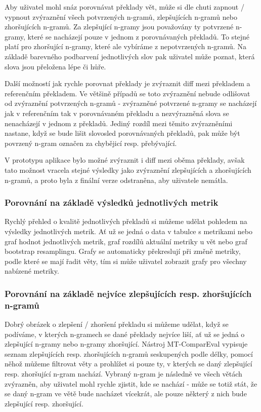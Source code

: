 Aby uživatel mohl snáz porovnávat překlady vět,
  může si dle chuti zapnout / vypnout zvýraznění všech potvrzených n-gramů,
  zlepšujících n-gramů nebo zhoršujících n-gramů.
Za zlepšující n-gramy jsou považovány ty potvrzené n-gramy,
  které se nacházejí pouze v jednom z porovnávaných překladů.
To stejné platí pro zhoršující n-gramy,
  které ale vybíráme z nepotvrzených n-gramů.
Na základě barevného podbarvení jednotlivých slov pak uživatel může poznat,
  která slova jsou přeložena lépe či hůře.

Další možností jak rychle porovnat překlady je zvýraznit diff mezi překladem a referenčním překladem.
Ve většině případů se toto zvýraznění nebude odlišovat od zvýraznění potvrzených n-gramů -
  zvýrazněné potvrzené n-gramy se nacházejí jak v referenčním tak v porovnávaném překladu
  a nezvýrazněná slova se nenacházejí v jednom z překladů.
Jediný rozdíl mezi těmito zvýrazněními nastane,
  když se bude lišit slovosled porovnávaných překladů,
  pak může být povrzený n-gram označen za chybějicí resp. přebývající.

V prototypu aplikace bylo možné zvýraznit i diff mezi oběma překlady,
  avšak tato možnost vracela stejné výsledky jako zvýraznění zlepšujících a zhoršujících n-gramů,
  a proto byla z finální verze odstraněna,
  aby uživatele nemátla.

\subsubsection{Porovnání na základě výsledků jednotlivých metrik}
Rychlý přehled o kvalitě jednotlivých překladů si můžeme udělat pohledem na výsledky jednotlivých metrik.
Ať už se jedná o data v tabulce s metrikami nebo graf hodnot jednotlivých metrik,
  graf rozdílů aktuální metriky u vět nebo graf bootstrap resamplingu.
Grafy se automaticky překreslují při změně metriky,
  podle které se mají řadit věty,
  tím si může uživatel zobrazit grafy pro všechny nabízené metriky.


\subsubsection{Porovnání na základě nejvíce zlepšujících resp. zhoršujících n-gramů}
Dobrý obrázek o zlepšení / zhoršení překladu si můžeme udělat,
  když se podíváme,
  v kterých n-gramech se dané překlady nejvíce liší,
  ať už se jedná o zlepšující n-gramy nebo n-gramy zhoršující.
Nástroj MT-ComparEval vypisuje seznam zlepšujících resp. zhoršujících n-gramů seskupených podle délky,
  pomocí něhož můžeme filtrovat věty a prohlížet si pouze ty,
  v kterých se daný zlepšující resp. zhoršující n-gram nachází.
Vybraný n-gram je následně ve všech větách zvýrazněn,
  aby uživatel mohl rychle zjistit, kde se nachází -
  může se totiž stát, že se daný n-gram ve větě bude nacházet vícekrát,
  ale pouze některý z nich bude zlepšující resp. zhoršující.

